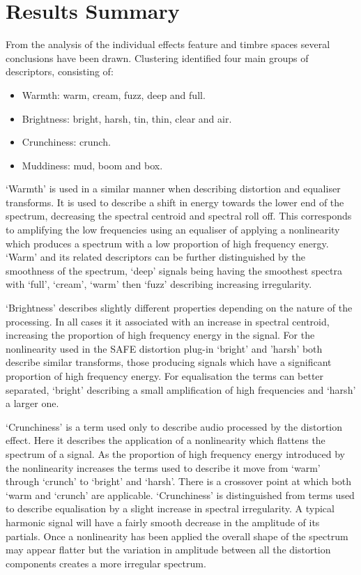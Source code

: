 \section{Results Summary}
	From the analysis of the individual effects feature and timbre spaces several conclusions have been drawn.
	Clustering identified four main groups of descriptors, consisting of:

	\begin{itemize}
		\item Warmth: warm, cream, fuzz, deep and full.
		\item Brightness: bright, harsh, tin, thin, clear and air.
		\item Crunchiness: crunch.
		\item Muddiness: mud, boom and box.
	\end{itemize}

	`Warmth' is used in a similar manner when describing distortion and equaliser transforms. It is used to describe a
	shift in energy towards the lower end of the spectrum, decreasing the spectral centroid and spectral roll off. This
	corresponds to amplifying the low frequencies using an equaliser of applying a nonlinearity which produces a
	spectrum with a low proportion of high frequency energy. `Warm' and its related descriptors can be further
	distinguished by the smoothness of the spectrum, `deep' signals being having the smoothest spectra with `full',
	`cream', `warm' then `fuzz' describing increasing irregularity.

	`Brightness' describes slightly different properties depending on the nature of the processing. In all cases it it
	associated with an increase in spectral centroid, increasing the proportion of high frequency energy in the signal.
	For the nonlinearity used in the SAFE distortion plug-in `bright' and 'harsh' both describe similar transforms,
	those producing signals which have a significant proportion of high frequency energy. For equalisation the terms
	can better separated, `bright' describing a small amplification of high frequencies and `harsh' a larger one.

	`Crunchiness' is a term used only to describe audio processed by the distortion effect. Here it describes the
	application of a nonlinearity which flattens the spectrum of a signal. As the proportion of high frequency energy
	introduced by the nonlinearity increases the terms used to describe it move from `warm' through `crunch' to
	`bright' and `harsh'. There is a crossover point at which both `warm and `crunch' are applicable. `Crunchiness' is
	distinguished from terms used to describe equalisation by a slight increase in spectral irregularity. A typical
	harmonic signal will have a fairly smooth decrease in the amplitude of its partials. Once a nonlinearity has been
	applied the overall shape of the spectrum may appear flatter but the variation in amplitude between all the
	distortion components creates a more irregular spectrum.

